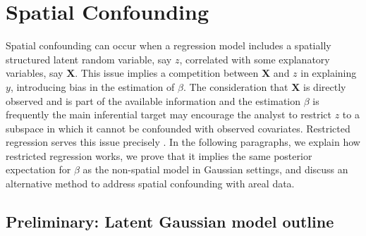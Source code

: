 \documentclass[openany, 11pt, oneside]{book}
\begin{document}
\section{Spatial Confounding} \label{section:confounding}

Spatial confounding can occur when a regression model includes a spatially structured latent random variable, say $z$, correlated with some explanatory variables, say $\boldsymbol{X}$. This issue implies a competition between $\boldsymbol{X}$ and $z$ in explaining $y$, introducing bias in the estimation of $\beta$. The consideration that $\boldsymbol{X}$ is directly observed and is part of the available information and the estimation $\beta$ is frequently the main inferential target may encourage the analyst to restrict $z$ to a subspace in which it cannot be confounded with observed covariates. Restricted regression serves this issue precisely \parencite{RHZ, Hodges}. In the following paragraphs, we explain how restricted regression works, we prove that it implies the same posterior expectation for $\beta$ as the non-spatial model in Gaussian settings, and discuss an alternative method to address spatial confounding with areal data.

\subsection{Preliminary: Latent Gaussian model outline} \label{subsection:LGM}
\end{document}
